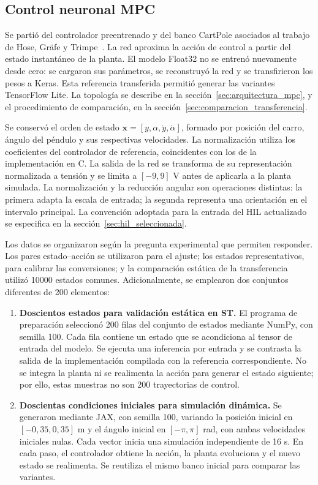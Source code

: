 \subsection{Control neuronal MPC}\label{sec:mpc_transferencia}

Se partió del controlador preentrenado y del banco CartPole asociados al trabajo de Hose, Gräfe y Trimpe~\cite{cap5_hose,cap5_repo}. La red aproxima la acción de control a partir del estado instantáneo de la planta. El modelo Float32 no se entrenó nuevamente desde cero: se cargaron sus parámetros, se reconstruyó la red y se transfirieron los pesos a Keras. Esta referencia transferida permitió generar las variantes TensorFlow Lite. La topología se describe en la sección~\ref{sec:arquitectura_mpc}, y el procedimiento de comparación, en la sección~\ref{sec:comparacion_transferencia}.

Se conservó el orden de estado $\mathbf{x}=[y,\alpha,\dot y,\dot\alpha]$, formado por posición del carro, ángulo del péndulo y sus respectivas velocidades. La normalización utiliza los coeficientes del controlador de referencia, coincidentes con los de la implementación en C. La salida de la red se transforma de su representación normalizada a tensión y se limita a $[-9,9]$ V antes de aplicarla a la planta simulada. La normalización y la reducción angular son operaciones distintas: la primera adapta la escala de entrada; la segunda representa una orientación en el intervalo principal. La convención adoptada para la entrada del HIL actualizado se especifica en la sección~\ref{sec:hil_seleccionada}.

Los datos se organizaron según la pregunta experimental que permiten responder. Los pares estado--acción se utilizaron para el ajuste; los estados representativos, para calibrar las conversiones; y la comparación estática de la transferencia utilizó 10000 estados comunes. Adicionalmente, se emplearon dos conjuntos diferentes de 200 elementos:

\begin{enumerate}
\item \textbf{Doscientos estados para validación estática en ST.} El programa de preparación seleccionó 200 filas del conjunto de estados mediante NumPy, con semilla 100. Cada fila contiene un estado que se acondiciona al tensor de entrada del modelo. Se ejecuta una inferencia por entrada y se contrasta la salida de la implementación compilada con la referencia correspondiente. No se integra la planta ni se realimenta la acción para generar el estado siguiente; por ello, estas muestras no son 200 trayectorias de control.
\item \textbf{Doscientas condiciones iniciales para simulación dinámica.} Se generaron mediante JAX, con semilla 100, variando la posición inicial en $[-0{,}35,0{,}35]$ m y el ángulo inicial en $[-\pi,\pi]$ rad, con ambas velocidades iniciales nulas. Cada vector inicia una simulación independiente de 16 s. En cada paso, el controlador obtiene la acción, la planta evoluciona y el nuevo estado se realimenta. Se reutiliza el mismo banco inicial para comparar las variantes.
\end{enumerate}

